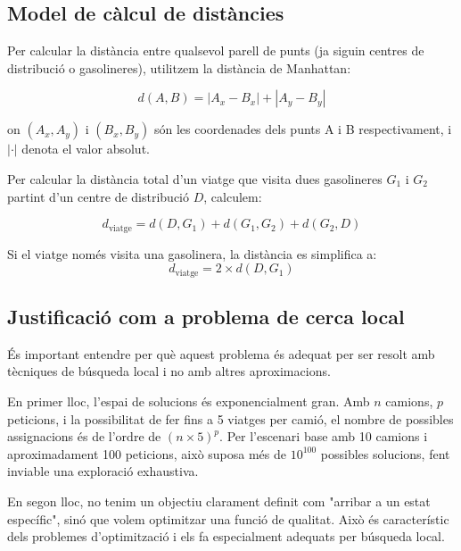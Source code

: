 \vspace{0.5cm}

\subsection{Model de càlcul de distàncies}

Per calcular la distància entre qualsevol parell de punts (ja siguin centres de distribució o gasolineres), utilitzem la distància de Manhattan:

\begin{equation}
d(A, B) = |A_x - B_x| + |A_y - B_y|
\label{eq:distance}
\end{equation}

on $(A_x, A_y)$ i $(B_x, B_y)$ són les coordenades dels punts A i B respectivament, i $|\cdot|$ denota el valor absolut.

Per calcular la distància total d'un viatge que visita dues gasolineres $G_1$ i $G_2$ partint d'un centre de distribució $D$, calculem:

\begin{equation}
d_{\text{viatge}} = d(D, G_1) + d(G_1, G_2) + d(G_2, D)
\label{eq:distance-viatge}
\end{equation}

Si el viatge només visita una gasolinera, la distància es simplifica a:
\begin{equation}
d_{\text{viatge}} = 2 \times d(D, G_1)
\label{eq:distance-viatge-simple}
\end{equation}

\vspace{0.5cm}

\subsection{Justificació com a problema de cerca local}

És important entendre per què aquest problema és adequat per ser resolt amb tècniques de búsqueda local i no amb altres aproximacions.

En primer lloc, l'espai de solucions és exponencialment gran. Amb $n$ camions, $p$ peticions, i la possibilitat de fer fins a 5 viatges per camió, el nombre de possibles assignacions és de l'ordre de $(n \times 5)^p$. Per l'escenari base amb 10 camions i aproximadament 100 peticions, això suposa més de $10^{100}$ possibles solucions, fent inviable una exploració exhaustiva.

En segon lloc, no tenim un objectiu clarament definit com "arribar a un estat específic", sinó que volem optimitzar una funció de qualitat. Això és característic dels problemes d'optimització i els fa especialment adequats per búsqueda local.

